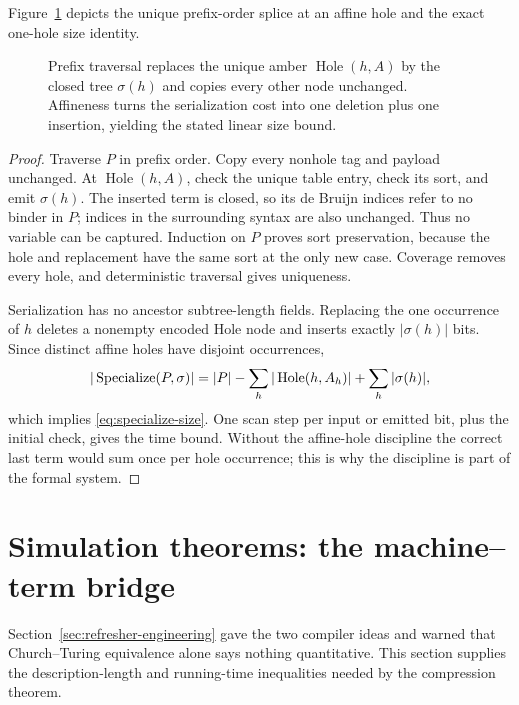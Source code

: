 Figure~\ref{fig:specialize} depicts the unique prefix-order splice at an affine
hole and the exact one-hole size identity.
\begin{figure}[H]
\centering

\caption{Prefix traversal replaces the unique amber \(\operatorname{Hole}(h,A)\) by the closed tree \(\sigma(h)\) and copies every other node unchanged.  Affineness turns the serialization cost into one deletion plus one insertion, yielding the stated linear size bound.}
\label{fig:specialize}
\end{figure}

\begin{proof}
Traverse \(P\) in prefix order.  Copy every nonhole tag and payload unchanged.
At \(\operatorname{Hole}(h,A)\), check the unique table entry, check its sort,
and emit \(\sigma(h)\).  The inserted term is closed, so its de Bruijn indices
refer to no binder in \(P\); indices in the surrounding syntax are also
unchanged.  Thus no variable can be captured.  Induction on \(P\) proves sort
preservation, because the hole and replacement have the same sort at the only
new case.  Coverage removes every hole, and deterministic traversal gives
uniqueness.

Serialization has no ancestor subtree-length fields.  Replacing the one
occurrence of \(h\) deletes a nonempty encoded Hole node and inserts exactly
\(|\sigma(h)|\) bits.  Since distinct affine holes have disjoint occurrences,
\[
 |\operatorname{Specialize}(P,\sigma)|
 =|P|-\sum_h|\operatorname{Hole}(h,A_h)|+\sum_h|\sigma(h)|,
\]
which implies \eqref{eq:specialize-size}.  One scan step per input or emitted
bit, plus the initial check, gives the time bound.  Without the affine-hole
discipline the correct last term would sum once per hole occurrence; this is
why the discipline is part of the formal system.
\end{proof}

\section{Simulation theorems: the machine--term bridge}
\label{sec:simulation}

\begin{reminder}
Section~\ref{sec:refresher-engineering} gave the two compiler ideas and warned
that Church--Turing equivalence alone says nothing quantitative.  This section
supplies the description-length and running-time inequalities needed by the
compression theorem.
\end{reminder}

